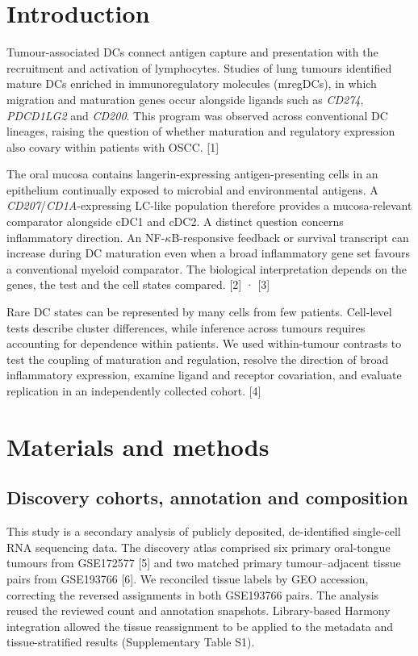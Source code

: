 \documentclass[11pt,a4paper]{article}
\begin{document}
\section{Introduction}
Tumour-associated DCs connect antigen capture and presentation with the recruitment and activation of lymphocytes. Studies of lung tumours identified mature DCs enriched in immunoregulatory molecules (mregDCs), in which migration and maturation genes occur alongside ligands such as \textit{CD274}, \textit{PDCD1LG2} and \textit{CD200}. This program was observed across conventional DC lineages, raising the question of whether maturation and regulatory expression also covary within patients with OSCC. [1]

The oral mucosa contains langerin-expressing antigen-presenting cells in an epithelium continually exposed to microbial and environmental antigens. A \textit{CD207}/\textit{CD1A}-expressing LC-like population therefore provides a mucosa-relevant comparator alongside cDC1 and cDC2. A distinct question concerns inflammatory direction. An NF-$\kappa$B-responsive feedback or survival transcript can increase during DC maturation even when a broad inflammatory gene set favours a conventional myeloid comparator. The biological interpretation depends on the genes, the test and the cell states compared. [2] · [3]

Rare DC states can be represented by many cells from few patients. Cell-level tests describe cluster differences, while inference across tumours requires accounting for dependence within patients. We used within-tumour contrasts to test the coupling of maturation and regulation, resolve the direction of broad inflammatory expression, examine ligand and receptor covariation, and evaluate replication in an independently collected cohort. [4]

\section{Materials and methods}
\subsection{Discovery cohorts, annotation and composition}
This study is a secondary analysis of publicly deposited, de-identified single-cell RNA sequencing data. The discovery atlas comprised six primary oral-tongue tumours from GSE172577 [5] and two matched primary tumour--adjacent tissue pairs from GSE193766 [6]. We reconciled tissue labels by GEO accession, correcting the reversed assignments in both GSE193766 pairs. The analysis reused the reviewed count and annotation snapshots. Library-based Harmony integration allowed the tissue reassignment to be applied to the metadata and tissue-stratified results (Supplementary Table S1).
\end{document}
